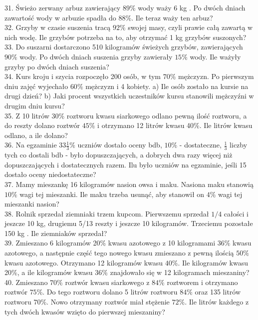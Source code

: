 \documentclass[10pt]{article}
\begin{document}
31. Świeżo zerwany arbuz zawierający \(89 \%\) wody waży 6 kg . Po dwóch dniach zawartość wody w arbuzie spadła do \(88 \%\). Ile teraz waży ten arbuz?\\
32. Grzyby w czasie suszenia tracą \(92 \%\) swojej masy, czyli prawie całą zawartą w nich wodę. Ile grzybów potrzeba na to, aby otrzymać 1 kg grzybów suszonych?\\
33. Do suszarni dostarczono 510 kilogramów świeżych grzybów, zawierających \(90 \%\) wody. Po dwóch dniach suszenia grzyby zawierały \(15 \%\) wody. Ile ważyły grzyby po dwóch dniach suszenia?\\
34. Kurs kroju i szycia rozpoczęło 200 osób, w tym \(70 \%\) mężczyzn. Po pierwszym dniu zajęć wyjechało \(60 \%\) mężczyzn i 4 kobiety. a) Ile osób zostało na kursie na drugi dzień? b) Jaki procent wszystkich uczestników kursu stanowili mężczyźni w drugim dniu kursu?\\
35. Z 10 litrów \(30 \%\) roztworu kwasu siarkowego odlano pewną ilość roztworu, a do reszty dolano roztwór \(45 \%\) i otrzymano 12 litrów kwasu 40\%. Ile litrów kwasu odlano, a ile dolano?\\
36. Na egzaminie \(33 \frac{1}{3} \%\) uczniów dostało oceny bdb, \(10 \%\) - dostateczne, \(\frac{1}{3}\) liczby tych co dostali bdb - było dopuszczających, a dobrych dwa razy więcej niż dopuszczających i dostatecznych razem. Ilu było uczniów na egzaminie, jeśli 15 dostało oceny niedostateczne?\\
37. Mamy mieszankę 16 kilogramów nasion owsa i maku. Nasiona maku stanowią \(10 \%\) wagi tej mieszanki. Ile maku trzeba usunąć, aby stanowił on \(4 \%\) wagi tej mieszanki nasion?\\
38. Rolnik sprzedał ziemniaki trzem kupcom. Pierwszemu sprzedał \(1 / 4\) całości i jeszcze 10 kg, drugiemu 5/13 reszty i jeszcze 10 kilogramów. Trzeciemu pozostałe 150 kg . Ile ziemniaków sprzedał?\\
39. Zmieszano 6 kilogramów 20\% kwasu azotowego z 10 kilogramami \(36 \%\) kwasu azotowego, a następnie część tego nowego kwasu zmieszano z pewną ilością \(50 \%\) kwasu azotowego. Otrzymano 12 kilogramów kwasu \(40 \%\). Ile kilogramów kwasu 20\%, a ile kilogramów kwasu \(36 \%\) znajdowało się w 12 kilogramach mieszaniny?\\
40. Zmieszano \(70 \%\) roztwór kwasu siarkowego z \(84 \%\) roztworem i otrzymano roztwór \(75 \%\). Do tego roztworu dolano 5 litrów roztworu \(84 \%\) oraz 135 litrów roztworu \(70 \%\). Nowo otrzymany roztwór miał stężenie \(72 \%\). Ile litrów każdego z tych dwóch kwasów wzięto do pierwszej mieszaniny?\\
\end{document}
